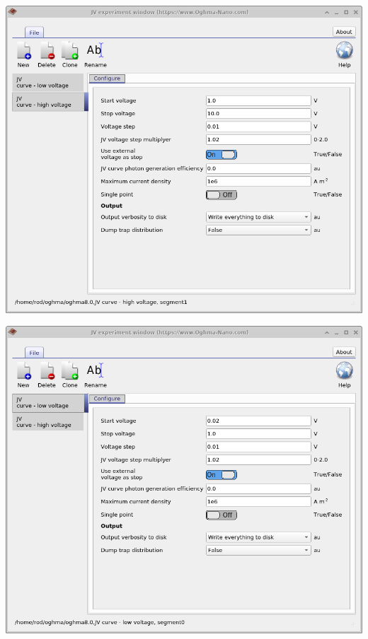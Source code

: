 \begin{minipage}{0.5\textwidth}
	\centering
	\includegraphics[width=\linewidth,height=0.8\linewidth]{./images/sim_editors/jv_high_voltage.png}
	\label{fig:jv_low}
\end{minipage}
\hspace{4pt}
\begin{minipage}[]{0.5\linewidth}
	\centering
	\includegraphics[width=\linewidth,height=0.8\linewidth]{./images/sim_editors/jv_low_voltage.png}
	\label{fig:jv_high}
\end{minipage}

